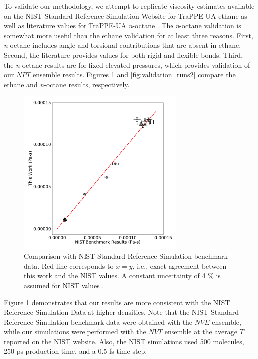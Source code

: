 \documentclass[preprint,review,12pt]{elsarticle}
\begin{document}
    To validate our methodology, we attempt to replicate viscosity estimates available on the NIST Standard Reference Simulation Website \cite{NIST_SRSW} for TraPPE-UA ethane as well as literature values for TraPPE-UA \textit{n}-octane \cite{Kioupis2000,Nieto2006}. The \textit{n}-octane validation is somewhat more useful than the ethane validation for at least three reasons. First, \textit{n}-octane includes angle and torsional contributions that are absent in ethane. Second, the literature provides values for both rigid and flexible bonds. Third, the \textit{n}-octane results are for fixed elevated pressures, which provides validation of our $NPT$ ensemble results. Figures \ref{fig:validation_runs} and \ref{fig:validation_runs2} compare the ethane and \textit{n}-octane results, respectively.
    
    
    \begin{figure}[htb!]
    	\centering
    	\includegraphics[width=3.2in]{NIST_ethane_TraPPE_validation.pdf}
    	\caption{Comparison with NIST Standard Reference Simulation benchmark data. Red line corresponds to $x = y$, i.e., exact agreement between this work and the NIST values. A constant uncertainty of 4 \% is assumed for NIST values \cite{NIST_SRSW}.}
    	\label{fig:validation_runs}
    \end{figure} 

    Figure \ref{fig:validation_runs} demonstrates that our results are more consistent with the NIST Reference Simulation Data at higher densities. Note that the NIST Standard Reference Simulation benchmark data were obtained with the $NVE$ ensemble, while our simulations were performed with the $NVT$ ensemble at the average $T$ reported on the NIST website. Also, the NIST simulations used 500 molecules, 250 ps production time, and a 0.5 fs time-step.  
    
\end{document}
